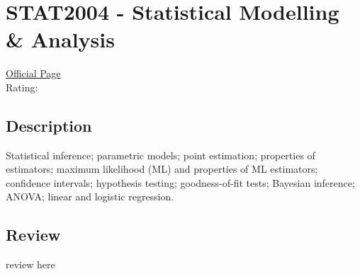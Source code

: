 \hypertarget{STAT2004}{\section{STAT2004 - Statistical Modelling \& Analysis}}

\large
\textcolor{turbo_purple}{\href{https://my.uq.edu.au/programs-courses/course.html?course_code=STAT2004}{Official Page}} \\
Rating: \cstar\cstar\cstar\cstar\ostar

\normalsize
\subsection*{Description}
Statistical inference; parametric models; point estimation; properties of estimators; maximum likelihood (ML) and properties of ML estimators; confidence intervals; hypothesis testing; goodness-of-fit tests; Bayesian inference; ANOVA; linear and logistic regression.

\subsection*{Review}
review here
